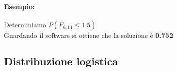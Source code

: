 \documentclass[]{article}
\begin{document}
    \paragraph{Esempio:} Determiniamo $P(F_{6, 14} \leq 1.5)$ \\
    Guardando il software si ottiene che la soluzione è \textbf{0.752}

    \subsection{Distribuzione logistica}
\end{document}
